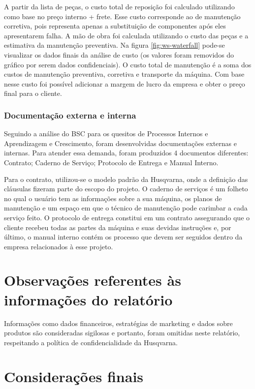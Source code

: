 \documentclass[12pt]{article}
\begin{document}
	A partir da lista de peças, o custo total de reposição foi calculado utilizando como base no preço interno + frete. Esse custo corresponde ao de manutenção corretiva, pois representa apenas a substituição de componentes após eles apresentarem falha. A mão de obra foi calculada utilizando o custo das peças e a estimativa da manutenção preventiva. Na figura \ref{fig:ws-waterfall} pode-se visualizar os dados finais da análise de custo (os valores foram removidos do gráfico por serem dados confidenciais). O custo total de manutenção é a soma dos custos de manutenção preventiva, corretiva e transporte da máquina. Com base nesse custo foi possível adicionar a margem de lucro da empresa e obter o preço final para o cliente.
	
\subsubsection{Documentação externa e interna}

	Seguindo a análise do BSC para os quesitos de Processos Internos e Aprendizagem e Crescimento, foram desenvolvidas documentações externas e internas. Para atender essa demanda, foram produzidos 4 documentos diferentes: Contrato; Caderno de Serviço; Protocolo de Entrega e Manual Interno.

	Para o contrato, utilizou-se o modelo padrão da Husqvarna, onde a definição das cláusulas fizeram parte do escopo do projeto. O caderno de serviços é um folheto no qual o usuário tem as informações sobre a sua máquina, os planos de manutenção e um espaço em que o técnico de manutenção pode carimbar a cada serviço feito. O protocolo de entrega constitui em um contrato assegurando que o cliente recebeu todas as partes da máquina e suas devidas instruções e, por último, o manual interno contém os processo que devem ser seguidos dentro da empresa relacionados à esse projeto.

\pagebreak

\section{Observações referentes às informações do relatório
}
	Informações como dados financeiros, estratégias de marketing e dados sobre produtos são consideradas sigilosas e portanto, foram omitidas neste relatório, respeitando a política de confidencialidade da Husqvarna.
\pagebreak

\section{Considerações finais}
	
\end{document}
